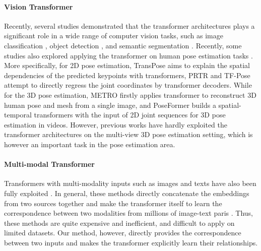 \documentclass{bmvc2k}
\begin{document}
\paragraph{Vision Transformer} Recently, several studies demonstrated that the transformer architectures \cite{vaswani2017attention} plays a significant role in a wide range of computer vision tasks, such as image classification \cite{dosovitskiy2020image, touvron2020training, chen2021crossvit}, object detection \cite{carion2020end, zhu2020deformable}, and semantic segmentation \cite{zheng2020rethinking, wang2020end, yan2022after}. 
Recently, some studies also explored applying the transformer on human pose estimation tasks \cite{yang2020transpose,li2021pose, mao2021tfpose, lin2020end, zheng20213d}. 
More specifically, for 2D pose estimation, TransPose \cite{yang2020transpose} aims to explain the spatial dependencies of the predicted keypoints with transformers, PRTR \cite{li2021pose} and TF-Pose \cite{mao2021tfpose} attempt to directly regress the joint coordinates by transformer decoders. 
While for the 3D pose estimation, METRO \cite{lin2020end} firstly applies transformer to reconstruct 3D human pose and mesh from a single image, and PoseFormer \cite{zheng20213d} builds a spatial-temporal transformers with the input of 2D joint sequences for 3D pose estimation in videos. 
However, previous works have hardly exploited the transformer architectures on the multi-view 3D pose estimation setting, which is however an important task in the pose estimation area. 


\vspace{-1.0em}
\paragraph{Multi-modal Transformer}
Transformers with multi-modality inputs such as images and texts have also been fully exploited \cite{kim2021vilt, tan2019lxmert, su2019vl, li2020unicoder, zhuge2021kaleido, you2021mrd, you2021self}. In general, these methods directly concatenate the embeddings from two sources together \cite{kim2021vilt} and make the transformer itself to learn the correspondence between two modalities from  millions of image-text paris \cite{sharma2018conceptual}. 
Thus, these methods are quite expensive and inefficient, and difficult to apply on limited datasets. Our method, however, directly provides the correspondence between two inputs and makes the transformer explicitly learn their relationships. 
\end{document}
